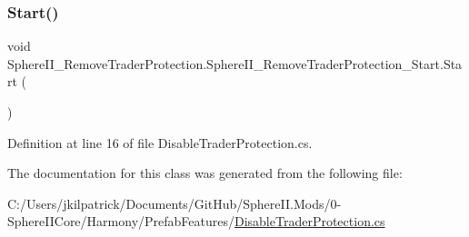 \subsubsection{\texorpdfstring{Start()}{Start()}}
{\footnotesize\ttfamily void Sphere\+I\+I\+\_\+\+Remove\+Trader\+Protection.\+Sphere\+I\+I\+\_\+\+Remove\+Trader\+Protection\+\_\+\+Start.\+Start (\begin{DoxyParamCaption}{ }\end{DoxyParamCaption})}



Definition at line 16 of file Disable\+Trader\+Protection.\+cs.



The documentation for this class was generated from the following file\+:\begin{DoxyCompactItemize}
\item 
C\+:/\+Users/jkilpatrick/\+Documents/\+Git\+Hub/\+Sphere\+I\+I.\+Mods/0-\/\+Sphere\+I\+I\+Core/\+Harmony/\+Prefab\+Features/\mbox{\hyperlink{_disable_trader_protection_8cs}{Disable\+Trader\+Protection.\+cs}}\end{DoxyCompactItemize}
